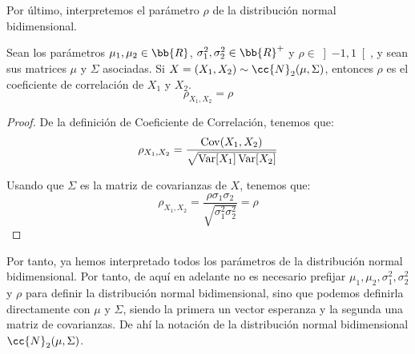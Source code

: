 Por último, interpretemos el parámetro $\rho$ de la distribución normal bidimensional.
\begin{prop}
    Sean los parámetros $\mu_1, \mu_2\in \bb{R}$, $\sigma_1^2, \sigma_2^2\in \bb{R}^+$ y $\rho\in \left]-1,1\right[$, y sean sus matrices $\mu$ y $\Sigma$ asociadas.
    Si $X=(X_1, X_2)\sim \cc{N}_2(\mu, \Sigma)$, entonces $\rho$ es el coeficiente de correlación de $X_1$ y $X_2$.
    \begin{equation*}
        \rho_{X_1, X_2}=\rho
    \end{equation*}
\end{prop}
\begin{proof}
    De la definición de Coeficiente de Correlación, tenemos que:
    \begin{equation*}
        \rho_{X_1, X_2}=\dfrac{\operatorname{Cov}(X_1, X_2)}{\sqrt{\operatorname{Var}[X_1]\operatorname{Var}[X_2]}}
    \end{equation*}

    Usando que $\Sigma$ es la matriz de covarianzas de $X$, tenemos que:
    \begin{equation*}
        \rho_{X_1, X_2}=\dfrac{\rho\sigma_1\sigma_2}{\sqrt{\sigma_1^2\sigma_2^2}}=\rho
    \end{equation*}
\end{proof}

Por tanto, ya hemos interpretado todos los parámetros de la distribución normal bidimensional. Por tanto, de aquí en adelante no es necesario prefijar $\mu_1, \mu_2, \sigma_1^2, \sigma_2^2$ y $\rho$ para definir la distribución normal bidimensional, sino que podemos definirla directamente con $\mu$ y $\Sigma$, siendo la primera un vector esperanza y la segunda una matriz de covarianzas. De ahí la notación de la distribución normal bidimensional $\cc{N}_2(\mu, \Sigma)$.

